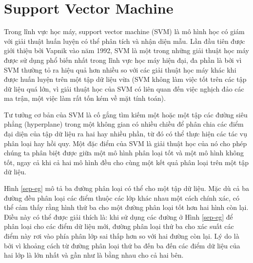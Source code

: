 \section{Support Vector Machine}
Trong lĩnh vực học máy, support vector machine (SVM) là mô hình học có giám với giải thuật huấn luyện có thể phân tích và nhận diện mẫu. Lần đầu tiên được giới thiệu bởi Vapnik vào năm 1992, SVM là một trong những giải thuật học máy được sử dụng phổ biến nhất trong lĩnh vực học máy hiện đại, đa phần là bởi vì SVM thường tỏ ra hiệu quả hơn nhiều so với các giải thuật học máy khác khi được huấn luyện trên một tập dữ liệu vừa (SVM không làm việc tốt trên các tập dữ liệu quá lớn, vì giải thuật học của SVM có liên quan đến việc nghịch đảo các ma trận, một việc làm rất tốn kém về mặt tính toán). 

Tư tưởng cơ bản của SVM là cố gắng tìm kiếm một hoặc một tập các đường siêu phẳng (hyperplane) trong một không gian có nhiều chiều để phân chia các điểm đại diện của tập dữ liệu ra hai hay nhiều phần, từ đó có thể thực hiện các tác vụ phân loại hay hồi quy. Một đặc điểm của SVM là giải thuật học của nó cho phép chúng ta phân biệt được giữa một mô hình phân loại tốt và một mô hình không tốt, ngay cả khi cả hai mô hình đều cho cùng một kết quả phân loại trên một tập dữ liệu.

Hình \ref{sep-eg} mô tả ba đường phân loại có thể cho một tập dữ liệu. Mặc dù cả ba đường đều phân loại các điểm thuộc các lớp khác nhau một cách chính xác, có thể cảm thấy rằng hình thứ ba cho một đường phân loại tốt hơn hai hình còn lại. Điều này có thể được giải thích là: khi sử dụng các đường ở Hình \ref{sep-eg} để phân loại cho các điểm dữ liệu mới, đường phân loại thứ ba cho xác suất các điểm này rơi vào phía phân lớp sai thấp hơn so với hai đường còn lại. Lý do là bởi vì khoảng cách từ đường phân loại thứ ba đến ba đến các điểm dữ liệu của hai lớp là lớn nhất và gần như là bằng nhau cho cả hai bên.

